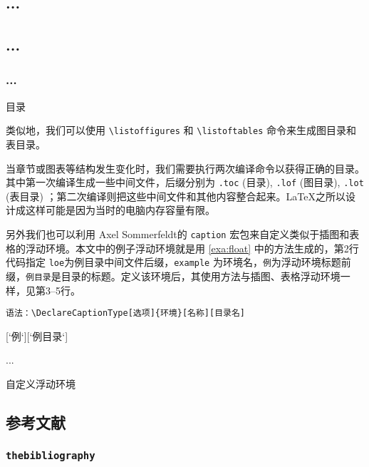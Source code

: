 \begin{example}[!h]
\begin{Code}[]
\tableofcontents
\setcounter{tocdepth}{2}
\chapter*{...}
\section*{...}
\subsection*{...}
\end{Code}
\caption{目录}
\label{exa:toc}
\end{example}

类似地，我们可以使用 \verb|\listoffigures| 和 \verb|\listoftables| 命令来生成图目录和表目录。

当章节或图表等结构发生变化时，我们需要执行两次编译命令以获得正确的目录。其中第一次编译生成一些中间文件，后缀分别为 \texttt{.toc} (目录), \texttt{.lof} (图目录), \texttt{.lot} (表目录) ；第二次编译则把这些中间文件和其他内容整合起来。\LaTeX 之所以设计成这样可能是因为当时的电脑内存容量有限。

另外我们也可以利用 Axel Sommerfeldt\indexSommerfeldt 的 \texttt{caption} 宏包\citep{Sommerfeldt_caption}来自定义类似于插图和表格的浮动环境。本文中的例子浮动环境就是用 \autoref{exa:float} 中的方法生成的，第2行代码指定 \texttt{loe}为例目录中间文件后缀，\texttt{example} 为环境名，\texttt{例}为浮动环境标题前缀，\texttt{例目录}是目录的标题。定义该环境后，其使用方法与插图、表格浮动环境一样，见第3--5行。

\noindent
\verb|语法：\DeclareCaptionType[选项]{环境}[名称][目录名]|
\begin{example}[htbp]
\begin{Code}[numbers=none]
\usepackage{caption}
[`例`][`例目录`]
\begin{example}[htbp]
...
\end{example}
\end{Code}
\caption{自定义浮动环境}
\label{exa:float}
\end{example}

\section{参考文献}

\subsection{\texttt{thebibliography}}
\label{sec:thebibliography}

